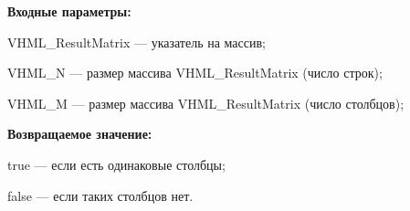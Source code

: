 \textbf{Входные параметры:}
 
VHML\_ResultMatrix --- указатель на массив;
 
VHML\_N --- размер массива VHML\_ResultMatrix (число строк);
 
VHML\_M --- размер массива VHML\_ResultMatrix (число столбцов);

\textbf{Возвращаемое значение:}

 true --- если есть одинаковые столбцы;
 
 false --- если таких столбцов нет.